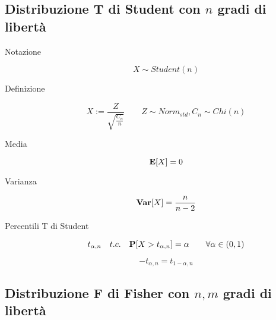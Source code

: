 \subsection{Distribuzione T di Student con $n$ gradi di libertà}

\begin{description}
	
	\item [Notazione]
		\begin{equation}
		X \sim Student(n)
		\end{equation}
	
	\item [Definizione]
		\begin{equation}
		X := \frac{Z}{\sqrt{\frac{C_{n}}{n}}} \qquad Z \sim Norm_{std},C_{n} \sim Chi(n)
		\end{equation}
	
	\item [Media]
		\begin{equation}
		\mathbf{E}[X] = 0
		\end{equation}
	
	\item [Varianza]
		\begin{equation}
		\mathbf{Var}[X] = \frac{n}{n-2}
		\end{equation}
	
	\item [Percentili T di Student]
		\begin{equation}
		t_{\alpha,n}\quad t.c. \quad \mathbf{P}[X > t_{\alpha,n}] = \alpha \qquad\forall \alpha \in (0,1)
		\end{equation}
		
		\begin{equation}
		-t_{\alpha,n} = t_{1-\alpha,n}
		\end{equation}
	
\end{description}


\subsection{Distribuzione F di Fisher con $n,m$ gradi di libertà}


